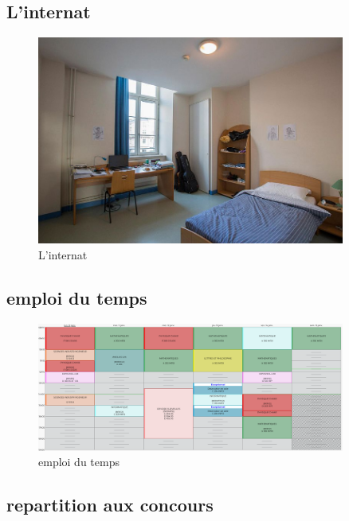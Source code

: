 \documentclass{beamer}
\begin{document}
\subsection{L'internat}

\begin{frame}
    \begin{figure}
        \centering
        \includegraphics[width=0.9\textwidth]{ressource_diapo/Internat_Gay-Lussac_1.jpg}
        \caption{L'internat}
    \end{figure}
\end{frame}

\subsection{emploi du temps}

\begin{frame}
    \begin{figure}
        \centering
        \includegraphics[width=0.9\textwidth]{ressource_diapo/emploi_du_temps.png}
        \caption{emploi du temps}
    \end{figure}
\end{frame}

\subsection{repartition aux concours}
\end{document}
